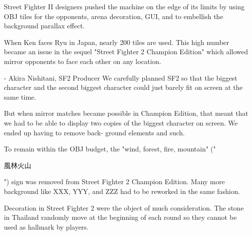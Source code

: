 Street Fighter II designers pushed the machine on the edge of its limits by using OBJ tiles for the opponents, arena decoration, GUI, and to embellish the background parallax effect.

When Ken faces Ryu in Japan, nearly 200 tiles are used. This high number became an issue in the sequel "Street Fighter 2 Champion Edition" which allowed mirror opponents to face each other on any location.
\vfill
{}
\pagebreak

\begin{q}{- Akira Nishitani, SF2 Producer}
We carefully planned SF2 so that the biggest character and the second biggest character could just barely fit on screen at the same time. 

But when mirror matches became possible in Champion Edition, that meant that we had to be able to display two copies of the biggest character on screen. We ended up having to remove back- ground elements and such.
\end{q}
To remain within the OBJ budget, the "wind, forest, fire, mountain" ("\begin{CJK}{UTF8}{min}風林火山\end{CJK}") sign was removed from Street Fighter 2 Champion Edition. Many more background like XXX, YYY, and ZZZ had to be reworked in the same fashion.

\begin{trivia}
Decoration in Street Fighter 2 were the object of much consideration. The stone in Thailand randomly move at the beginning of each round so they cannot be used as hallmark by players.

\end{trivia}

\vfill
{}


\begin{minipage}[t]{0.32\linewidth}
\end{minipage}%
\hfill%
\begin{minipage}[t]{0.32\linewidth}
\end{minipage}
\hfill%
\begin{minipage}[t]{0.32\linewidth}
\end{minipage}

\begin{minipage}[t]{0.32\linewidth}
\end{minipage}%
\hfill%
\begin{minipage}[t]{0.32\linewidth}
\end{minipage}
\hfill%
\begin{minipage}[t]{0.32\linewidth}
\end{minipage}

